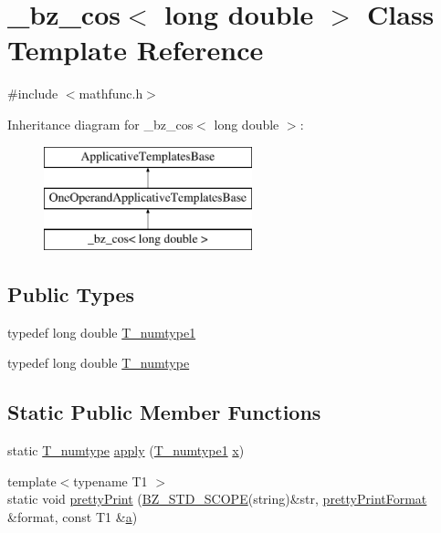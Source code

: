 \hypertarget{class__bz__cos_3_01long_01double_01_4}{}\section{\+\_\+bz\+\_\+cos$<$ long double $>$ Class Template Reference}
\label{class__bz__cos_3_01long_01double_01_4}


{\ttfamily \#include $<$mathfunc.\+h$>$}

Inheritance diagram for \+\_\+bz\+\_\+cos$<$ long double $>$\+:\begin{figure}[H]
\begin{center}
\leavevmode
\includegraphics[height=3.000000cm]{class__bz__cos_3_01long_01double_01_4}
\end{center}
\end{figure}
\subsection*{Public Types}
\begin{DoxyCompactItemize}
\item 
typedef long double \hyperlink{class__bz__cos_3_01long_01double_01_4_a8f88978c0d39b3e60a89ab45d435bd5e}{T\+\_\+numtype1}
\item 
typedef long double \hyperlink{class__bz__cos_3_01long_01double_01_4_ac17be012d27ae02979dd39d6a58186e5}{T\+\_\+numtype}
\end{DoxyCompactItemize}
\subsection*{Static Public Member Functions}
\begin{DoxyCompactItemize}
\item 
static \hyperlink{class__bz__cos_3_01long_01double_01_4_ac17be012d27ae02979dd39d6a58186e5}{T\+\_\+numtype} \hyperlink{class__bz__cos_3_01long_01double_01_4_aa8f7cd78017c0ffda8b2bfe9cfdde6bf}{apply} (\hyperlink{class__bz__cos_3_01long_01double_01_4_a8f88978c0d39b3e60a89ab45d435bd5e}{T\+\_\+numtype1} \hyperlink{vecnorm1_8cc_ac73eed9e41ec09d58f112f06c2d6cb63}{x})
\item 
{\footnotesize template$<$typename T1 $>$ }\\static void \hyperlink{class__bz__cos_3_01long_01double_01_4_a89989c95b4c54c5215bf7dcd1bb0eefb}{pretty\+Print} (\hyperlink{numinquire_8h_a2b24ffc3b4ef9803956bc7715c6c7b83}{B\+Z\+\_\+\+S\+T\+D\+\_\+\+S\+C\+O\+P\+E}(string)\&str, \hyperlink{classprettyPrintFormat}{pretty\+Print\+Format} \&format, const T1 \&\hyperlink{gen__mat5files_8m_aae328bf20413f220e38aec4d95bfd6da}{a})
\end{DoxyCompactItemize}


